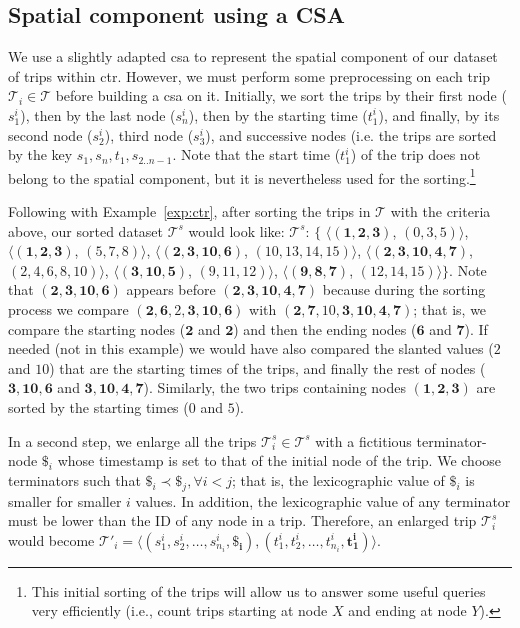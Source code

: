 	\subsection{Spatial component using a CSA}
	\label{sec:ctr:str:spat}
	We use a slightly adapted \gls{csa} to represent the spatial component of our dataset of trips within \gls{ctr}. 
	However, we must perform some preprocessing on each trip  $\mathcal{T}_i \in \mathcal{T}$ before building a \gls{csa} on it. Initially, we sort the trips by their first node ($s^i_1$), then by the last node ($s^i_n$), then by the starting time ($t^i_1$), and finally, by its second node ($s^i_2$), third node ($s^i_3$), and successive nodes (i.e. the trips are sorted by the key $s_1,s_n,t_1,s_{2..n-1}$.  Note that the start time ($t^i_1$) of the trip does not belong to the spatial component, but it is nevertheless used for the sorting.\footnote{This initial sorting of the trips will allow us to answer some useful queries very efficiently  (i.e., count trips starting at node $X$ and ending at node $Y$).}

	Following with Example~\ref{exp:ctr}, after sorting the trips in $\mathcal{T}$ with the criteria above, 
	our sorted dataset $\mathcal{T}^s$ would look like: 
	$\mathcal{T}^s$: $\{$%
	$\langle (\mathbf{1,2,3     })$, $(\mathit{0,3,5})                     \rangle$, 
	$\langle (\mathbf{1,2,3     })$, $(\mathit{5,7,8})                     \rangle$, 
	$\langle (\mathbf{2,3,10,6  })$, $(\mathit{10,13,14,15})           \rangle$, 
	$\langle (\mathbf{2,3,10,4,7})$, $(\mathit{2,4,6,8,10}) \rangle$, 
	$\langle (\mathbf{3,10,5    })$, $(\mathit{9,11,12})                     \rangle$, 
	$\langle (\mathbf{9,8,7     })$, $(\mathit{12,14,15})                    \rangle$$\}$. 
	Note that  $ (\mathbf{2,3,10,6  })$ appears before $(\mathbf{2,3,10,4,7})$ because
	during the sorting process we compare $ (\mathbf{2,6,\mathit{2},3, 10,6  })$ with $ (\mathbf{2,7,\mathit{10},3, 10,4,7})$;
	that is, we compare the starting nodes ($\mathbf{2}$ and $\mathbf{2}$) and then the ending nodes ($\mathbf{6}$ and $\mathbf{7}$).
	If needed  (not in this example) we would have also compared the slanted values ($\mathit{2}$ and $\mathit{10}$) 
	that are the starting times of the trips, and finally the rest of nodes  ($ \mathbf{3, 10,6  }$ and $ \mathbf{3, 10,4,7}$).
	Similarly, the two trips containing nodes $ (\mathbf{1,2,3})$ are sorted by the starting times ($\mathit{0}$ and $\mathit{5}$).


	In a second step, we enlarge all the trips $\mathcal{T}^s_i \in \mathcal{T}^s$ with a fictitious terminator-node $\$_i$ whose
	timestamp is set to that of the initial node of the trip. We choose terminators such that $\$_i \prec \$_j, \forall i<j$; 
	that is, the lexicographic value of $\$_i$ is smaller for smaller $i$ values. In addition, the lexicographic value
	of any terminator must be lower than the ID of any node in a trip. Therefore, an enlarged trip $\mathcal{T}^s_i$
	would become $\mathcal{T}'_i =  \langle (s^i_1, s^i_2, \dots,  s^i_{n_i}, 
	\mathbf{\$_i}),(t^i_1, t^i_2, \dots,  t^i_{n_i}, \mathbf{t^i_1}) \rangle$. 

